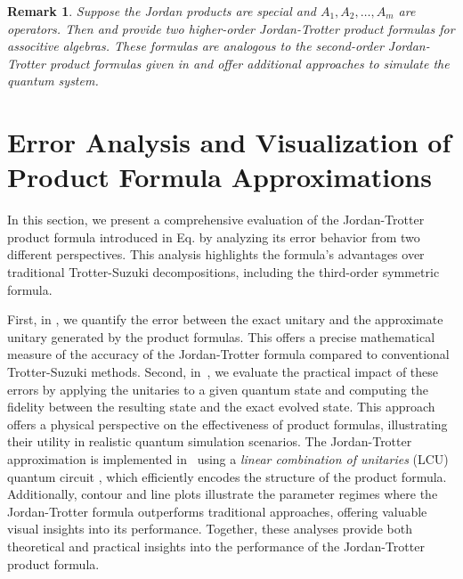 \documentclass{article}
\theoremstyle{plain} %
\newtheorem{rmk}[thm]{Remark}
\numberwithin{equation}{section}
\begin{document}
\begin{rmk}\label{rmk:product:new} Suppose the Jordan products are special and $A_1, A_2, \dots, A_m$ are operators. Then {\rm {}} and {\rm {}} provide two higher-order Jordan-Trotter product formulas for associtive algebras. These formulas are analogous to the second-order Jordan-Trotter product formulas given in {\rm \cite[Theorem 2.1 and Theorem 2.3]{wang:2023:suzuki}} and offer additional approaches to simulate the quantum system. \end{rmk}


\section{Error Analysis and Visualization of Product Formula Approximations}\label{sec:example}

In this section, we present a comprehensive evaluation of the Jordan-Trotter product formula introduced in Eq.  by analyzing its error behavior from two different perspectives. This analysis highlights the formula's  advantages over traditional Trotter-Suzuki decompositions, including the third-order symmetric formula.

First, in , we quantify the error between the exact unitary and the approximate unitary generated by the product formulas. This offers a precise mathematical measure of the accuracy of the Jordan-Trotter formula compared to conventional Trotter-Suzuki methods.
%
Second, in~, we evaluate the practical impact of these errors by applying the unitaries to a given quantum state and computing the fidelity between the resulting state and the exact evolved state. This approach offers a physical perspective on the effectiveness of product formulas, illustrating their utility in realistic quantum simulation scenarios. 
%
The Jordan-Trotter approximation is implemented in~ using a \textit{linear combination of unitaries} (LCU) quantum circuit \cite{childs:wiebe:2012:hamiltonian}, which efficiently encodes the structure of the product formula. Additionally, contour and line plots illustrate the parameter regimes where the Jordan-Trotter formula outperforms traditional approaches, offering valuable visual insights into its performance.
%
Together, these analyses provide both theoretical and practical insights into the performance of the Jordan-Trotter product formula.
\end{document}
